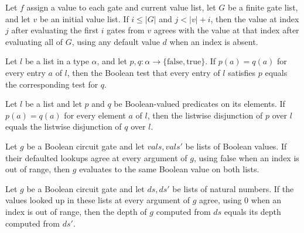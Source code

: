 \begin{theorem}
\label{BoolCircuit.runWith_getD_take}
\leanok
{}
Let $f$ assign a value to each gate and current value list, let $G$ be a finite gate
list, and let $v$ be an initial value list. If $i\le |G|$ and $j<|v|+i$, then the value
at index $j$ after evaluating the first $i$ gates from $v$ agrees with the value at that
index after evaluating all of $G$, using any default value $d$ when an index is absent.
\end{theorem}

\begin{theorem}
\label{BoolCircuit.all_congr_mem}
\leanok
{}
Let $l$ be a list in a type $\alpha$, and let
$p,q:\alpha\to\{\mathrm{false},\mathrm{true}\}$. If $p(a)=q(a)$ for every entry $a$ of
$l$, then the Boolean test that every entry of $l$ satisfies $p$ equals the
corresponding test for $q$.
\end{theorem}

\begin{theorem}
\label{BoolCircuit.any_congr_mem}
\leanok
{}
Let $l$ be a list and let $p$ and $q$ be Boolean-valued predicates on its elements. If
$p(a)=q(a)$ for every element $a$ of $l$, then the listwise disjunction of $p$ over $l$
equals the listwise disjunction of $q$ over $l$.
\end{theorem}

\begin{theorem}
\label{BoolCircuit.DAGGate.eval_congr}
\leanok
{}
Let $g$ be a Boolean circuit gate and let $vals,vals'$ be lists of Boolean values. If
their defaulted lookups agree at every argument of $g$, using false when an index is out
of range, then $g$ evaluates to the same Boolean value on both lists.
\end{theorem}

\begin{theorem}
\label{BoolCircuit.DAGGate.depth_congr}
\leanok
{}
Let $g$ be a Boolean circuit gate and let $ds,ds'$ be lists of natural numbers. If the
values looked up in these lists at every argument of $g$ agree, using $0$ when an index
is out of range, then the depth of $g$ computed from $ds$ equals its depth computed from
$ds'$.
\end{theorem}

